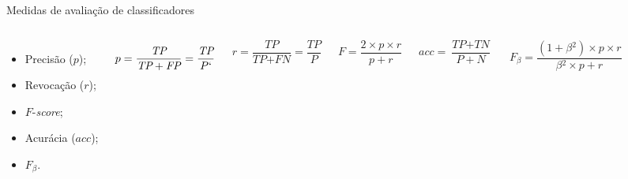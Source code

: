 \documentclass[%
  10pt,%
  aspectratio = 169,%
  compress,%
  t,%
]{beamer}%
\begin{document}
        \begin{frame}[fragile = singleslide]{}{Medidas de avaliação de classificadores}
        \begin{columns}[t]
            \begin{itemize}
                \item Precisão ($p$);

                \item Revocação ($r$);

                \item $F$-\textit{score};

                \item Acurácia ($acc$);

                \item $F_\beta{}$.
            \end{itemize}


            \begin{equation}
                \label{eq:medida-precisão}
        		p =
        		\frac{\textit{TP}}{\textit{TP} + \textit{FP}}
        		= \frac{\textit{TP}}{P`}
            \end{equation}

            \begin{equation}
                \label{eq:medida-revocação}
        		r =
        		\frac{\textit{TP}}{\textit{TP} + \textit{FN}}
        		= \frac{\textit{TP}}{P}
            \end{equation}

            \begin{equation}
                \label{eq:medida-f-score}
        		F =
        		\frac{2 \times p \times r}{p + r}
            \end{equation}

            \begin{equation}
                \label{eq:medida-acurácia}
        		acc =
        		\frac{\textit{TP} + \textit{TN}}{P + N}
            \end{equation}

            \begin{equation}
                \label{eq:medida-f-beta}
        		F_\beta{} =
        		\frac{(1 + \beta{}^2) \times p \times r}{\beta{}^2 \times p + r}
            \end{equation}
        \end{columns}
    \end{frame}
\end{document}
